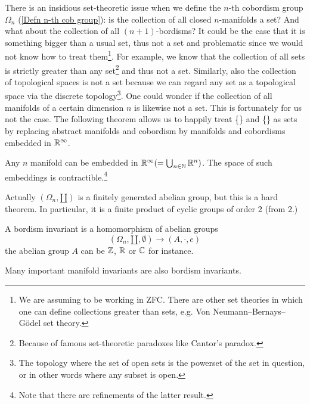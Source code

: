 \begin{rem}
    There is an insidious set-theoretic issue when we define the $n$-th cobordism group $\Omega_n$ (\ref{Defn n-th cob group}): is the collection of all closed $n$-manifolds a set? And what about the collection of all $(n+1)$-bordisms? It could be the case that it is something bigger than a usual set, thus not a set and problematic since we would not know how to treat them\footnote{We are assuming to be working in ZFC. There are other set theories in which one can define collections greater than sets, e.g. Von Neumann–Bernays–Gödel set theory.}. For example, we know that the collection of all sets is strictly greater than any set\footnote{Because of famous set-theoretic paradoxes like Cantor's paradox.} and thus not a set. Similarly, also the collection of topological spaces is not a set because we can regard any set as a topological space via the discrete topology\footnote{The topology where the set of open sets is the powerset of the set in question, or in other words where any subset is open.}. One could wonder if the collection of all manifolds of a certain dimension $n$ is likewise not a set. This is fortunately for us not the case. The following theorem allows us to happily treat \{\} and \{\} as sets by replacing abstract manifolds and cobordism by manifolds and cobordisms embedded in $\mathbb{R}^{\infty}$.
\end{rem}
\begin{thm}
    Any $n$ manifold can be embedded in $\mathbb{R}^{\infty}(=\bigcup_{n\in\mathbb{N}}\mathbb{R}^n)$. The space of such embeddings is contractible.\footnote{Note that there are refinements of the latter result.}
\end{thm}

\begin{rem}
    Actually $(\Omega_n,\amalg)$ is a finitely generated abelian group, but this is a hard theorem. In particular, it is a finite product of cyclic groups of order $2$ (from 2.)
\end{rem}

\begin{defn}
    A bordism invariant is a homomorphism of abelian groups $$(\Omega_n,\amalg,\emptyset) \to (A,\cdot,e)$$ 
    the abelian group $A$ can be $\mathbb{Z}$, $\mathbb{R}$ or $\mathbb{C}$ for instance.
\end{defn}
\begin{rem}
    Many important manifold invariants are also bordism invariants.
\end{rem}

